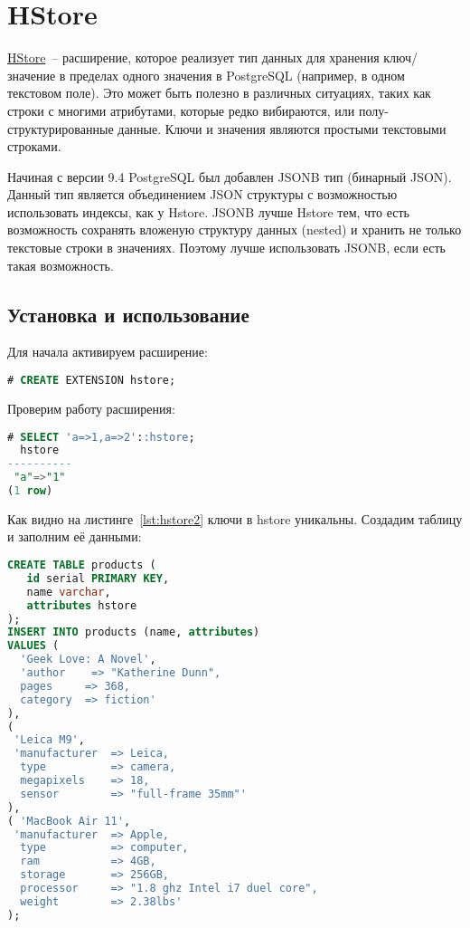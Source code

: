 \section{HStore}
\label{sec:hstore-extension}

\href{https://www.postgresql.org/docs/current/static/hstore.html}{HStore}~-- расширение, которое реализует тип данных для хранения ключ/значение в пределах одного значения в PostgreSQL (например, в одном текстовом поле). Это может быть полезно в различных ситуациях, таких как строки с многими атрибутами, которые редко вибираются, или полу-структурированные данные. Ключи и значения являются простыми текстовыми строками.

Начиная с версии 9.4 PostgreSQL был добавлен JSONB тип (бинарный JSON). Данный тип является объединением JSON структуры с возможностью использовать индексы, как у Hstore. JSONB лучше Hstore тем, что есть возможность сохранять вложеную структуру данных (nested) и хранить не только текстовые строки в значениях. Поэтому лучше использовать JSONB, если есть такая возможность.

\subsection{Установка и использование}

Для начала активируем расширение:

\begin{lstlisting}[language=SQL,label=lst:hstore1,caption=Активация hstore]
# CREATE EXTENSION hstore;
\end{lstlisting}

Проверим работу расширения:

\begin{lstlisting}[language=SQL,label=lst:hstore2,caption=Проверка hstore]
# SELECT 'a=>1,a=>2'::hstore;
  hstore
----------
 "a"=>"1"
(1 row)
\end{lstlisting}

Как видно на листинге~\ref{lst:hstore2} ключи в hstore уникальны. Создадим таблицу и заполним её данными:

\begin{lstlisting}[language=SQL,label=lst:hstore3,caption=Проверка hstore]
CREATE TABLE products (
   id serial PRIMARY KEY,
   name varchar,
   attributes hstore
);
INSERT INTO products (name, attributes)
VALUES (
  'Geek Love: A Novel',
  'author    => "Katherine Dunn",
  pages     => 368,
  category  => fiction'
),
(
 'Leica M9',
 'manufacturer  => Leica,
  type          => camera,
  megapixels    => 18,
  sensor        => "full-frame 35mm"'
),
( 'MacBook Air 11',
 'manufacturer  => Apple,
  type          => computer,
  ram           => 4GB,
  storage       => 256GB,
  processor     => "1.8 ghz Intel i7 duel core",
  weight        => 2.38lbs'
);
\end{lstlisting}

